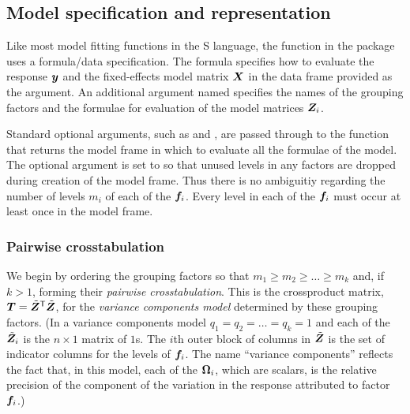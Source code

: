 \documentclass[12pt]{article}
\begin{document}
\subsection{Model specification and representation}
\label{sec:Representation}

Like most model fitting functions in the S language, the 
function in the  package uses a formula/data specification.
The formula specifies how to evaluate the response $\bm{y}$ and the
fixed-effects model matrix $\bm{X}$ in the data frame provided as the
 argument.  An additional argument named 
specifies the names of the grouping factors and the formulae for
evaluation of the model matrices $\bm{Z}_i$.

Standard optional arguments, such as  and
, are passed through to the  function
that returns the model frame in which to evaluate all the formulae of
the model.  The  optional argument is set to
 so that unused levels in any factors are dropped during
creation of the model frame.  Thus there is no ambiguitiy regarding
the number of levels $m_i$ of each of the $\bm{f}_i$.  Every level in
each of the $\bm{f}_i$ must occur at least once in the model frame.

\subsubsection{Pairwise crosstabulation}

We begin by ordering the grouping factors so that $m_1\ge m_2\ge \dots
\ge m_k$ and, if $k>1$, forming their \emph{pairwise crosstabulation}.
This is the crossproduct matrix, $\bm{T}=\tilde{\bm{Z}}^\mathsf{T}\tilde{\bm{Z}}$,
for the \emph{variance components model} determined by these grouping
factors.  (In a variance components model $q_1=q_2=\dots=q_k=1$ and
each of the $\tilde{\bm{Z}}_i$ is the $n\times 1$ matrix of $1$s.  The
$i$th outer block of columns in $\tilde{\bm{Z}}$ is the set of indicator
columns for the levels of $\bm{f}_i$.  The name ``variance components''
reflects the fact that, in this model, each of the $\bm{\Omega}_i$, which
are scalars, is the relative precision of the component of the
variation in the response attributed to factor $\bm{f}_i$.)
\end{document}
